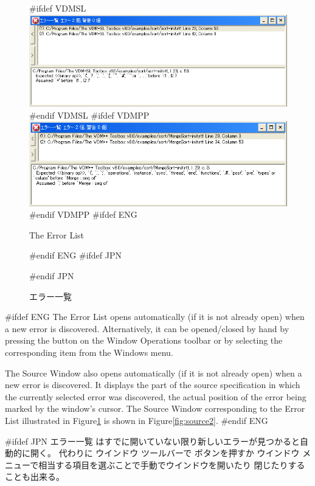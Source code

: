 \documentclass[\pformat,12pt]{article}
\newcommand{\guicmd}[1]{{\sf #1}}
\newcommand{\guicmd}[1]{{\gt #1}}
\begin{document}
\begin{figure}[tbh]
\begin{center}
#ifdef VDMSL
\includegraphics[width=\textwidth]{errorList-sl.png}
#endif VDMSL
#ifdef VDMPP
\includegraphics[width=\textwidth]{errorList-pp.png}
#endif VDMPP
#ifdef ENG
\caption{The Error List}
#endif ENG
#ifdef JPN
\caption{エラー一覧}
#endif JPN
\label{fig:error2}
\end{center}
\end{figure}

#ifdef ENG
The \guicmd{Error List} opens automatically (if it is not already
open) when a new error is discovered. Alternatively, it can be
opened/closed by hand by pressing the  
button on the \guicmd{Window Operations} toolbar or by
selecting the corresponding item from the \guicmd{Windows} menu.

The \guicmd{Source Window} also opens automatically (if it is not
already open) when a new error is discovered. It displays the part of 
the source specification in which the currently selected error was
discovered, the actual position of the error being marked by the
window's cursor. The \guicmd{Source Window} corresponding to the
\guicmd{Error List} illustrated in Figure\ref{fig:error2} is shown in  
Figure\ref{fig:source2}.
#endif ENG

#ifdef JPN
\guicmd{エラー一覧} はすでに開いていない限り新しいエラーが見つかると自動的に開く。
代わりに \guicmd{ウインドウ} ツールバーで 
ボタンを押すか
\guicmd{ウインドウ} メニューで相当する項目を選ぶことで手動でウインドウを開いたり
閉じたりすることも出来る。
\end{document}

